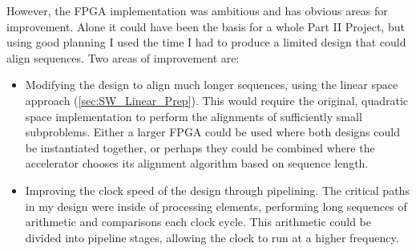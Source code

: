 However, the FPGA implementation was ambitious and has obvious areas for improvement.
Alone it could have been the basis for a whole Part II Project, but using good planning I used the time I had to produce a limited design that could align sequences.
Two areas of improvement are:
\begin{itemize}
\item Modifying the design to align much longer sequences, using the linear space approach (\cref{sec:SW_Linear_Prep}).
This would require the original, quadratic space implementation to perform the alignments of sufficiently small subproblems.
Either a larger FPGA could be used where both designs could be instantiated together, or perhaps they could be combined where the accelerator chooses its alignment algorithm based on sequence length.

\item Improving the clock speed of the design through pipelining.
The critical paths in my design were inside of processing elements, performing long sequences of arithmetic and comparisons each clock cycle.
This arithmetic could be divided into pipeline stages, allowing the clock to run at a higher frequency.

\end{itemize}
